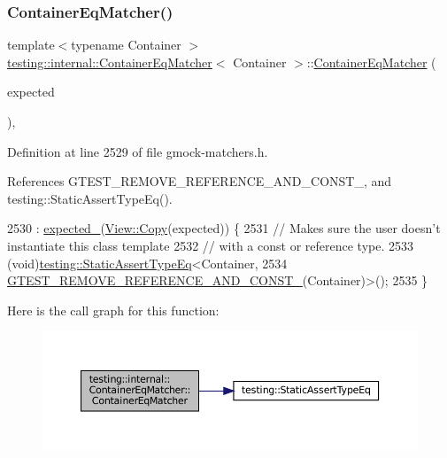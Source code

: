 \subsubsection{\texorpdfstring{Container\+Eq\+Matcher()}{ContainerEqMatcher()}}
{\footnotesize\ttfamily template$<$typename Container $>$ \\
\hyperlink{classtesting_1_1internal_1_1ContainerEqMatcher}{testing\+::internal\+::\+Container\+Eq\+Matcher}$<$ Container $>$\+::\hyperlink{classtesting_1_1internal_1_1ContainerEqMatcher}{Container\+Eq\+Matcher} (\begin{DoxyParamCaption}\item[{const Container \&}]{expected }\end{DoxyParamCaption})\hspace{0.3cm}{\ttfamily [inline]}, {\ttfamily [explicit]}}



Definition at line 2529 of file gmock-\/matchers.\+h.



References G\+T\+E\+S\+T\+\_\+\+R\+E\+M\+O\+V\+E\+\_\+\+R\+E\+F\+E\+R\+E\+N\+C\+E\+\_\+\+A\+N\+D\+\_\+\+C\+O\+N\+S\+T\+\_\+, and testing\+::\+Static\+Assert\+Type\+Eq().


\begin{DoxyCode}
2530       : \hyperlink{classtesting_1_1internal_1_1ContainerEqMatcher_ab5d9ad6869dc59908a4b1c72fde78d31}{expected\_}(\hyperlink{classtesting_1_1internal_1_1StlContainerView_a441123838221f1284873f66ed968f279}{View::Copy}(expected)) \{
2531     \textcolor{comment}{// Makes sure the user doesn't instantiate this class template}
2532     \textcolor{comment}{// with a const or reference type.}
2533     (void)\hyperlink{namespacetesting_a661e70fc6afeb5c085eed3716aa45059}{testing::StaticAssertTypeEq}<Container,
2534         \hyperlink{gtest-internal_8h_a874567b176266188fabfffb8393267ce}{GTEST\_REMOVE\_REFERENCE\_AND\_CONST\_}(Container)>();
2535   \}
\end{DoxyCode}
Here is the call graph for this function\+:
\nopagebreak
\begin{figure}[H]
\begin{center}
\leavevmode
\includegraphics[width=350pt]{classtesting_1_1internal_1_1ContainerEqMatcher_ad9a4c224c92176d57a865191f419802f_cgraph}
\end{center}
\end{figure}


